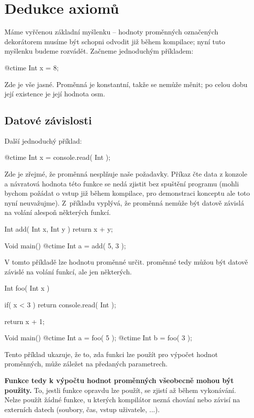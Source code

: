 \section{Dedukce axiomů}
Máme vyřčenou základní myšlenku -- hodnoty proměnných označených dekorátorem \ctime musíme být schopni odvodit již během kompilace; nyní tuto myšlenku budeme rozvádět. Začneme jednoduchým příkladem:
\begin{code}
@ctime Int x = 8;
\end{code}

Zde je vše jasné. Proměnná je konstantní, takže se nemůže měnit; po celou dobu její existence je její hodnota osm.

\subsection{Datové závislosti} \label{ctimeDataDependency}
Další jednoduchý příklad:
\begin{code}
@ctime Int x = console.read( Int );
\end{code}

Zde je zřejmé, že proměnná  nesplňuje naše požadavky. Příkaz  čte data z konzole a návratová hodnota této funkce se nedá zjistit bez spuštění programu (mohli bychom požádat o vstup již během kompilace, pro demonstraci konceptu ale toto nyní neuvažujme). Z~příkladu vyplývá, že \ctime proměnná nemůže být datově závislá na volání alespoň některých funkcí.

\begin{code}
Int add( Int x, Int y ) {
	return x + y;
}

Void main() {
	@ctime Int a = add( 5, 3 );
}
\end{code}
V tomto příkladě lze hodnotu proměnné  určit. \ctime proměnné tedy můžou být datově závislé na volání funkcí, ale jen některých.

\begin{code}
Int foo( Int x ) {
	if( x < 3 )
		return console.read( Int );

	return x + 1;
}

Void main() {
	@ctime Int a = foo( 5 );
	@ctime Int b = foo( 3 );
}
\end{code}

Tento příklad ukazuje, že to, zda funkci lze použít pro výpočet hodnot \ctime proměnných, může záležet na předaných parametrech.

\textbf{Funkce tedy k výpočtu hodnot \ctime proměnných všeobecně mohou být použity.} To, jestli funkce opravdu lze použít, se zjistí až během vykonávání. Nelze použít žádné funkce, u kterých kompilátor nezná chování nebo závisí na externích datech (soubory, čas, vstup uživatele, ...).

